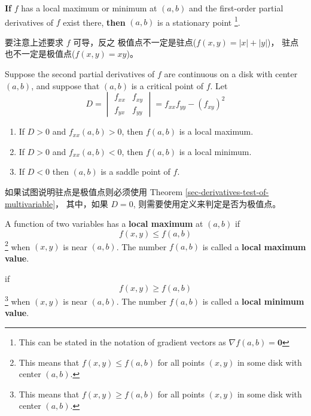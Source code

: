 \begin{theorem}
    \textbf{If} $f$ has a local maximum or minimum at $(a, b)$ and the 
    first-order partial derivatives of $f$ exist there, 
    \textbf{then} $(a, b)$ is a stationary point
    \footnote{
        This can be stated in the notation 
        of gradient vectors as $\nabla f(a, b) = \mathbf{0}$
    }.
\end{theorem}

要注意上述要求 $f$ 可导，反之
极值点不一定是驻点($f(x, y) = |x|+|y|$)，
驻点也不一定是极值点($f(x, y) = xy$)。

\begin{theorem}
    \label{sec-derivatives-test-of-multivariable}
    Suppose the second partial derivatives of $f$ are continuous
    on a disk with center $(a, b)$, and suppose that
    $(a, b)$ is a critical point of $f$.
    Let 
    \[
        D = \begin{vmatrix}
            f_{xx} & f_{xy} \\
            f_{yx} & f_{yy}
        \end{vmatrix}
        = f_{xx}f_{yy} - (f_{xy})^2
    \]
    \begin{enumerate}
        \item If $D > 0$ and $f_{xx}(a, b) > 0$, then $f(a, b)$ is a local maximum.
        \item If $D > 0$ and $f_{xx}(a, b) < 0$, then $f(a, b)$ is a local minimum.
        \item If $D < 0$ then $(a, b)$ is a saddle point of $f$.
    \end{enumerate}
\end{theorem}

如果试图说明驻点是极值点则必须使用 Theorem \ref{sec-derivatives-test-of-multivariable}，
其中，如果 $D = 0$, 则需要使用定义来判定是否为极值点。

\begin{definition}
    \label{def:max-min-val-multivariable}
    A function of two variables has a \textbf{local maximum} at $(a, b)$
    if 
    \[
        f(x, y) \leq f(a, b)
    \]
    \footnote{
        This means that $f(x, y) \leq f(a, b)$ for all points 
        $(x, y)$ in some disk with center $(a, b)$.
    }
    when $(x, y)$ is near $(a, b)$.
    The number $f(a, b)$ is called a \textbf{local maximum value}.

    if 
    \[
        f(x, y) \geq f(a, b)
    \]
    \footnote{
        This means that $f(x, y) \geq f(a, b)$ for all points 
        $(x, y)$ in some disk with center $(a, b)$.
    }
    when $(x, y)$ is near $(a, b)$.
    The number $f(a, b)$ is called a \textbf{local minimum value}.
\end{definition}

